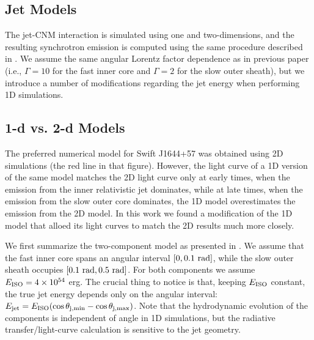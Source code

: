\documentclass[usenatbib,fleqn]{mnras}
\begin{document}


\subsection{Jet Models}
\label{sec:numerical}

The jet-CNM interaction is simulated using one and two-dimensions, and
the resulting synchrotron emission is computed using the same
procedure described in \citet{Mimica+2015}. We assume the same angular
Lorentz factor dependence as in previous paper (i.e., $\Gamma = 10$
for the fast inner core and $\Gamma = 2$ for the slow outer sheath),
but we introduce a number of modifications regarding the jet energy
when performing 1D simulations.

\subsection{1-d vs. 2-d Models}
\label{sec:2d}

The preferred numerical model for Swift J1644+57 \citep[Fig.10
in][]{Mimica+2015} was obtained using 2D simulations (the red line in
that figure). However, the light curve of a 1D version of the same
model \citep[black line in Fig. 10 in][see also section 4.2 of that
paper]{Mimica+2015} matches the 2D light curve only at early times,
when the emission from the inner relativistic jet dominates, while at
late times, when the emission from the slow outer core dominates, the
1D model overestimates the emission from the 2D model. In this work we
found a modification of the 1D model that alloed its light curves to
match the 2D results much more closely.

We first summarize the two-component model as presented in
\citet{Mimica+2015}. We assume that the fast inner core spans an
angular interval $[0, 0.1\ {\rm rad}]$, while the slow outer sheath
occupies $[0.1\ {\rm rad}, 0.5\ {\rm rad}]$. For both components we
assume $E_{\rm ISO} = 4\times 10^{54}$ erg. The crucial thing to
notice is that, keeping $E_{\rm ISO}$ constant, the true jet energy
depends only on the angular interval: $E_{\rm jet} = E_{\rm ISO}
(\cos\theta_{\rm j,min} - \cos\theta_{\rm j,max})$. Note that the
hydrodynamic evolution of the components is independent of angle in 1D
simulations, but the radiative transfer/light-curve calculation is
sensitive to the jet geometry.
\end{document}
